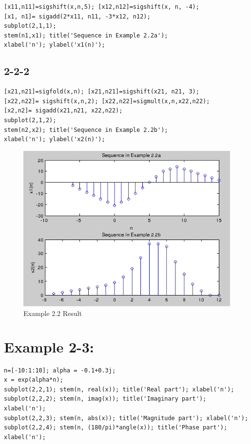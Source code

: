 \documentclass[11pt
  , a4paper
  , article
  , oneside
]{memoir}
\begin{document}
\begin{lstlisting}[style=termstyle]
[x11,n11]=sigshift(x,n,5); [x12,n12]=sigshift(x, n, -4);
[x1, n1]= sigadd(2*x11, n11, -3*x12, n12);
subplot(2,1,1);
stem(n1,x1); title('Sequence in Example 2.2a');
xlabel('n'); ylabel('x1(n)');
\end{lstlisting}

\section{2-2-2}
\begin{lstlisting}[style=termstyle]
[x21,n21]=sigfold(x,n); [x21,n21]=sigshift(x21, n21, 3);
[x22,n22]= sigshift(x,n,2); [x22,n22]=sigmult(x,n,x22,n22);
[x2,n2]= sigadd(x21,n21, x22,n22);
subplot(2,1,2);
stem(n2,x2); title('Sequence in Example 2.2b');
xlabel('n'); ylabel('x2(n)');
\end{lstlisting}

\begin{figure}[h!]
	\centering
	\includegraphics{./images/ex2-2.png}
	\caption{Example 2.2 Result}
	\label{fig:Example 2.2 Result} 
\end{figure}

\chapter{Example 2-3: }

\begin{lstlisting}[style=termstyle]
n=[-10:1:10]; alpha = -0.1+0.3j;
x = exp(alpha*n);
subplot(2,2,1); stem(n, real(x)); title('Real part'); xlabel('n');
subplot(2,2,2); stem(n, imag(x)); title('Imaginary part'); xlabel('n');
subplot(2,2,3); stem(n, abs(x)); title('Magnitude part'); xlabel('n');
subplot(2,2,4); stem(n, (180/pi)*angle(x)); title('Phase part'); xlabel('n');
\end{lstlisting}
\end{document}

